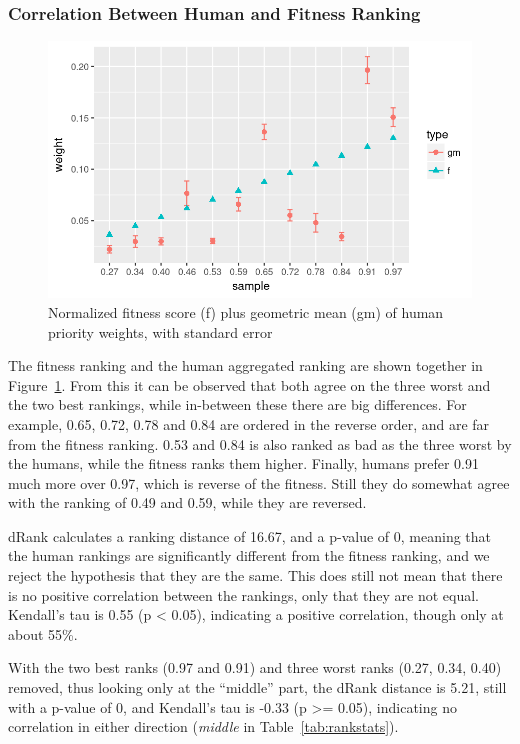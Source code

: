 \subsubsection{Correlation Between Human and Fitness Ranking}
\begin{figure}
    \centering
    \includegraphics[width=1.0\textwidth]{figures/weights}
    \caption[Fitness score plus geometric mean and arithmetic mean of priority weights]{Normalized fitness score (f) plus geometric mean (gm) of human priority weights, with standard error}
    \label{fig:weights}
\end{figure}

The fitness ranking and the human aggregated ranking are shown together in Figure~\ref{fig:weights}.
From this it can be observed that both agree on the three worst and the two best rankings, while in-between these there are big differences.
For example, 0.65, 0.72, 0.78 and 0.84 are ordered in the reverse order, and are far from the fitness ranking.
0.53 and 0.84 is also ranked as bad as the three worst by the humans, while the fitness ranks them higher.
Finally, humans prefer 0.91 much more over 0.97, which is reverse of the fitness.
Still they do somewhat agree with the ranking of 0.49 and 0.59, while they are reversed.

dRank calculates a ranking distance of 16.67, and a p-value of 0, meaning that the human rankings are significantly different from the fitness ranking, and we reject the hypothesis that they are the same.
This does still not mean that there is no positive correlation between the rankings, only that they are not equal.
Kendall's tau is 0.55 (p < 0.05), indicating a positive correlation, though only at about 55\%.

With the two best ranks (0.97 and 0.91) and three worst ranks (0.27, 0.34, 0.40) removed, thus looking only at the ``middle'' part, the dRank distance is 5.21, still with a p-value of 0, and Kendall's tau is -0.33 (p >= 0.05), indicating no correlation in either direction (\textit{middle} in Table~\ref{tab:rankstats}).


